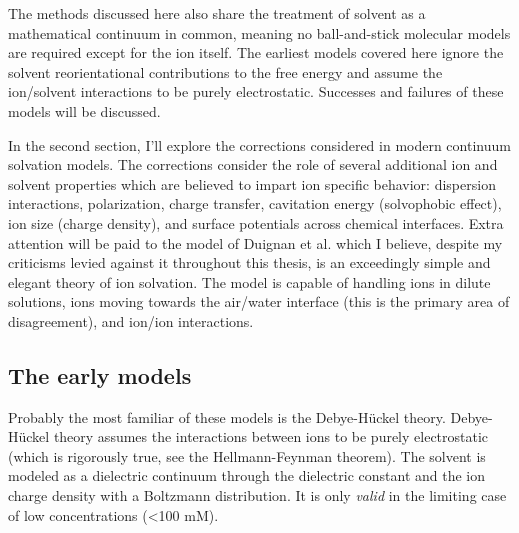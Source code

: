 \begin{intro}
   The methods discussed here also share the treatment of solvent as a mathematical continuum in common, meaning no ball-and-stick molecular models are required except for the ion 
   itself. The earliest models covered here ignore the solvent reorientational contributions to the free energy and assume the ion/solvent interactions to be purely electrostatic. 
   Successes and failures of these models will be discussed.
   
   In the second section, I'll explore the corrections considered in modern continuum solvation models. The corrections consider the role of several additional ion and solvent 
   properties which are believed to impart ion specific behavior: dispersion interactions, polarization, charge transfer, cavitation energy (solvophobic effect), ion size (charge 
   density), and surface potentials across chemical interfaces. Extra attention will be paid to the model of Duignan et al. which I believe, despite my criticisms levied against
   it throughout this thesis, is an exceedingly simple and elegant theory of ion solvation. The model is capable of handling ions in dilute solutions, ions moving towards the 
   air/water interface (this is the primary area of disagreement), and ion/ion interactions. 
  
   \subsection{\label{ch1:sec2:level2}The early models}
    Probably the most familiar of these models is the Debye-H\"{u}ckel theory. Debye-H\"{u}ckel theory assumes the interactions between ions to be purely electrostatic (which is
    rigorously true, see the Hellmann-Feynman theorem\cite{politzer2015mathematical}). The solvent is modeled as a dielectric continuum through the dielectric constant and the 
    ion charge density with a Boltzmann distribution. It is only \emph{valid} in the limiting case of low concentrations (<100 mM).
    
    
    
    

\end{intro}
